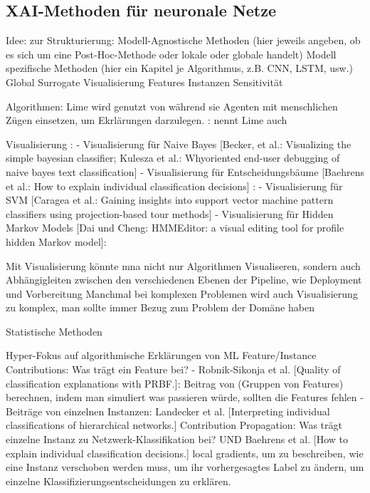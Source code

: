 \subsection{XAI-Methoden für neuronale Netze}
Idee: zur Strukturierung:
Modell-Agnostische Methoden (hier jeweils angeben, ob es sich um eine Post-Hoc-Methode oder lokale oder globale handelt)
Modell spezifische Methoden (hier ein Kapitel je Algorithmus, z.B. CNN, LSTM, usw.)
Global Surrogate
Visualisierung 
Features
Instanzen
Sensitivität


Algorithmen:
Lime wird genutzt von \cite{weitz2019you} während sie Agenten mit menschlichen Zügen einsetzen, um Ekrlärungen darzulegen.
\cite{goldenfein2019algorithmic}: nennt Lime auch

Visualisierung \cite{zhou20182d}:
- Visualisierung für Naive Bayes [Becker, et al.: Visualizing the simple bayesian classifier; Kulesza et al.: Whyoriented
end-user debugging of naive bayes text classification]
- Visualisierung für Entscheidungsbäume [Baehrens et al.: How to
explain individual classification decisions] : 
- Visualisierung für SVM [Caragea et al.: Gaining insights into support vector machine pattern
classifiers using projection-based tour methods]
- Visualisierung für Hidden Markov Models [Dai und Cheng: HMMEditor: a visual editing tool for profile hidden Markov model]:


Mit Visualisierung könnte mna nicht nur Algorithmen Visualiseren, sondern auch Abhängigleiten zwischen den verschiedenen Ebenen der Pipeline, wie Deployment und Vorbereitung \cite{zhou20182d}
Manchmal bei komplexen Problemen wird auch Visualisierung zu komplex, man sollte immer Bezug zum Problem der Domäne haben \cite{zhou20182d}


Statistische Methoden \cite{zhou20182d}

Hyper-Fokus auf algorithmische Erklärungen von ML\cite{zhou20182d}
Feature/Instance Contributions: Was trägt ein Feature bei?
- Robnik-Sikonja et al. [Quality of classification explanations with PRBF.]: Beitrag von (Gruppen von Features) berechnen, indem man simuliert was passieren würde, sollten die Features fehlen
- Beiträge von einzelnen Instanzen: Landecker et al. [Interpreting individual classifications of hierarchical networks.] Contribution Propagation: Was trägt einzelne Instanz zu Netzwerk-Klassifikation bei? UND Baehrens et al. [How to
explain individual classification decisions.] local gradients, um zu beschreiben, wie eine Instanz verschoben werden muss, um ihr vorhergesagtes Label zu ändern, um einzelne Klassifizierungsentscheidungen zu erklären. 

